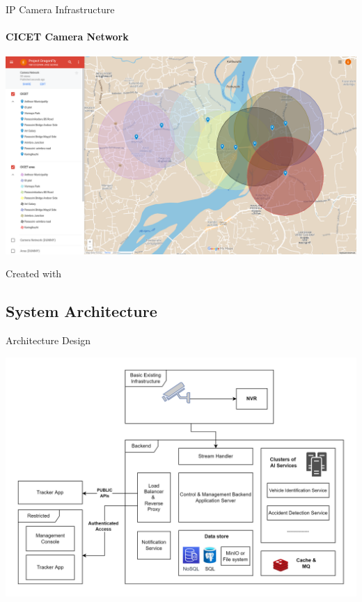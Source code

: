 \documentclass{beamer}
\newcommand{\link}[2]{\href{#1}{\textit{\color{blue}{#2}}}}%
\begin{document}
	\begin{frame}{IP Camera Infrastructure}
		\framesubtitle{CICET Camera Network}
		\begin{center}
			\includegraphics[height=0.7\textheight]{res/camera-network.png}
		\end{center}
		Created with \link{https://www.google.com/maps/d/edit?mid=1s2ST5x4nn-EK3JqU-c9EEGASRq5Ini0&usp=sharing}{Google Maps}
	\end{frame}
	
	\subsection{System Architecture}
	\begin{frame}{Architecture Design}
		\begin{center}
			\includegraphics[width=\linewidth]{res/architecture_high_level}
		\end{center}
	\end{frame}
\end{document}
